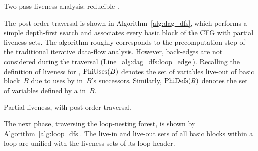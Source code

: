 \begin{algorithm}[H]
    \caption{Two-pass liveness analysis: reducible \@CFG.}
  \label{alg:twopass}
\end{algorithm}

The post-order traversal is shown in Algorithm~\ref{alg:dag_dfs}, which performs a simple depth-first search and associates every basic block of the CFG with partial liveness sets.
The algorithm roughly corresponds to the precomputation step of the traditional iterative data-flow analysis.
However, back-edges are not considered during the traversal (Line~\ref{alg:dag_dfs:loop_edge}).
Recalling the definition of liveness for \phifuns, $\textrm{PhiUses}(B)$ denotes the set of variables live-out of basic block~$B$ due to uses by \phifuns in~$B$'s successors.
Similarly, $\textrm{PhiDefs}(B)$ denotes the set of variables defined by a \phifun in~$B$.

\begin{algorithm}[H]
  \caption{Partial liveness, with post-order traversal.}
  \label{alg:dag_dfs}
\end{algorithm}

The next phase, traversing the loop-nesting forest, is shown by Algorithm~\ref{alg:loop_dfs}.
The live-in and live-out sets of all basic blocks within a loop are unified with the liveness sets of its loop-header.

